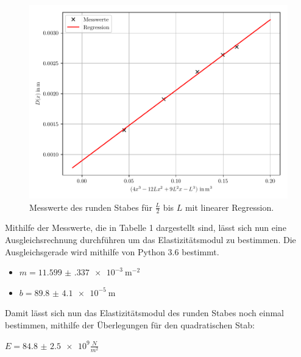 \begin{figure}[H]
  \centering
  \includegraphics[width=\textwidth]{ausgleichsgerade4.1.pdf}
  \caption{Messwerte des runden Stabes für $\frac{L}{2}$ bis $L$ mit linearer Regression.}
\end{figure}

Mithilfe der Messwerte, die in Tabelle 1 dargestellt sind, lässt sich nun eine
Ausgleichsrechnung durchführen um das Elastizitätsmodul zu bestimmen. Die Ausgleichsgerade
wird mithilfe von Python 3.6 bestimmt.

\begin{itemize}
  \item $m = \SI{11.599(337)e-3}{\meter\tothe{-2}}$
  \item $b = \SI{89.8(41)e-5}{\meter}$
\end{itemize}


Damit lässt sich nun das Elastizitätsmodul des runden Stabes noch einmal bestimmen,
mithilfe der Überlegungen für den quadratischen Stab:

\centerline{$E= \num{84.8(25)e9} \frac{N}{m^2}$}
